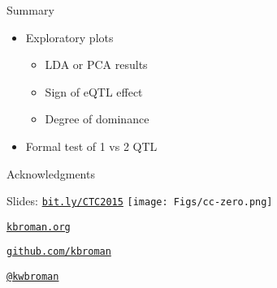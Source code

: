 \documentclass[12pt,t]{beamer}
\begin{document}
\begin{frame}[c]{Summary}
  \begin{itemize}
  \itemsep18pt
  \item Exploratory plots
    \vspace*{12pt}
    \begin{itemize}
    \itemsep12pt
    \item LDA or PCA results
    \item Sign of eQTL effect
    \item Degree of dominance
    \end{itemize}
  \item Formal test of 1 vs 2 QTL
  \end{itemize}
\end{frame}


\begin{frame}{Acknowledgments}
\end{frame}


\begin{frame}[c]{}

\Large

Slides: \href{http://bit.ly/CTC2015}{\tt bit.ly/CTC2015} \quad
\texttt{[image: Figs/cc-zero.png]}

\vspace{10mm}

\href{http://kbroman.org}{\tt kbroman.org}

\vspace{10mm}

\href{https://github.com/kbroman}{\tt github.com/kbroman}

\vspace{10mm}

\href{https://twitter.com/kwbroman}{\tt @kwbroman}


\end{frame}
\end{document}
